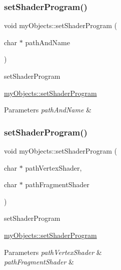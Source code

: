 \subsubsection{\texorpdfstring{set\+Shader\+Program()}{setShaderProgram()}\hspace{0.1cm}{\footnotesize\ttfamily [2/3]}}
{\footnotesize\ttfamily void my\+Objects\+::set\+Shader\+Program (\begin{DoxyParamCaption}\item[{char $\ast$}]{path\+And\+Name }\end{DoxyParamCaption})\hspace{0.3cm}{\ttfamily [virtual]}}



set\+Shader\+Program 

\hyperlink{classmyObjects_a317bbb41dd176f37b9bf909637841e97}{my\+Objects\+::set\+Shader\+Program}


\begin{DoxyParams}{Parameters}
{\em path\+And\+Name} & \\
\hline
\end{DoxyParams}
\mbox{\label{classmyObjects_a8329f8b4d6818478737873390072c563}} 
\subsubsection{\texorpdfstring{set\+Shader\+Program()}{setShaderProgram()}\hspace{0.1cm}{\footnotesize\ttfamily [3/3]}}
{\footnotesize\ttfamily void my\+Objects\+::set\+Shader\+Program (\begin{DoxyParamCaption}\item[{char $\ast$}]{path\+Vertex\+Shader,  }\item[{char $\ast$}]{path\+Fragment\+Shader }\end{DoxyParamCaption})\hspace{0.3cm}{\ttfamily [virtual]}}



set\+Shader\+Program 

\hyperlink{classmyObjects_a317bbb41dd176f37b9bf909637841e97}{my\+Objects\+::set\+Shader\+Program}


\begin{DoxyParams}{Parameters}
{\em path\+Vertex\+Shader} & \\
\hline
{\em path\+Fragment\+Shader} & \\
\hline
\end{DoxyParams}
\mbox{\label{classmyObjects_ad58306f67d79a54ac844e194b08704c6}} 
